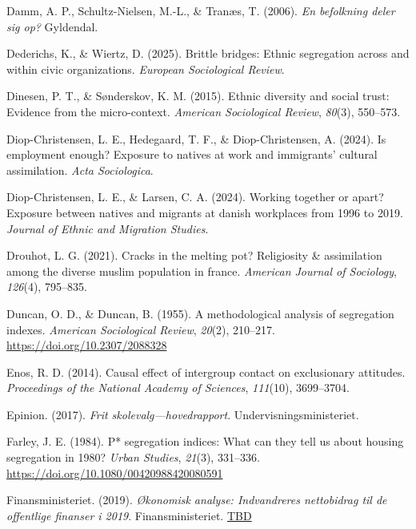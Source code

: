 \documentclass[
]{book}
\newlength{\cslhangindent}
\newenvironment{CSLReferences}[2] %
 {\begin{list}{}{%
  \setlength{\itemindent}{0pt}
  \setlength{\leftmargin}{0pt}
  \setlength{\parsep}{0pt}
  \ifodd #1
   \setlength{\leftmargin}{\cslhangindent}
   \setlength{\itemindent}{-1\cslhangindent}
  \fi
  \setlength{\itemsep}{#2\baselineskip}}}
 {\end{list}}
\begin{document}
\begin{CSLReferences}{1}{0}
Damm, A. P., Schultz-Nielsen, M.-L., \& Tranæs, T. (2006). \emph{En befolkning deler sig op?} Gyldendal.

Dederichs, K., \& Wiertz, D. (2025). Brittle bridges: Ethnic segregation across and within civic organizations. \emph{European Sociological Review}.

Dinesen, P. T., \& Sønderskov, K. M. (2015). Ethnic diversity and social trust: Evidence from the micro-context. \emph{American Sociological Review}, \emph{80}(3), 550--573.

Diop-Christensen, L. E., Hedegaard, T. F., \& Diop-Christensen, A. (2024). Is employment enough? Exposure to natives at work and immigrants' cultural assimilation. \emph{Acta Sociologica}.

Diop-Christensen, L. E., \& Larsen, C. A. (2024). Working together or apart? Exposure between natives and migrants at danish workplaces from 1996 to 2019. \emph{Journal of Ethnic and Migration Studies}.

Drouhot, L. G. (2021). Cracks in the melting pot? Religiosity \& assimilation among the diverse muslim population in france. \emph{American Journal of Sociology}, \emph{126}(4), 795--835.

Duncan, O. D., \& Duncan, B. (1955). A methodological analysis of segregation indexes. \emph{American Sociological Review}, \emph{20}(2), 210--217. \url{https://doi.org/10.2307/2088328}

Enos, R. D. (2014). Causal effect of intergroup contact on exclusionary attitudes. \emph{Proceedings of the National Academy of Sciences}, \emph{111}(10), 3699--3704.

Epinion. (2017). \emph{Frit skolevalg---hovedrapport}. Undervisningsministeriet.

Farley, J. E. (1984). P* segregation indices: What can they tell us about housing segregation in 1980? \emph{Urban Studies}, \emph{21}(3), 331--336. \url{https://doi.org/10.1080/00420988420080591}

Finansministeriet. (2019). \emph{Økonomisk analyse: Indvandreres nettobidrag til de offentlige finanser i 2019}. Finansministeriet. \href{https://TBD}{TBD}


\end{CSLReferences}
\end{document}
